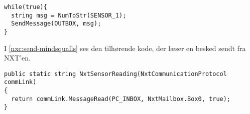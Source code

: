 \begin{lstlisting}[style=c,label=nxc:send,caption={Eksempel på afsending af besked.}]
while(true){
  string msg = NumToStr(SENSOR_1);
  SendMessage(OUTBOX, msg);
}
\end{lstlisting}

I \cref{nxc:send-mindsqualls} ses den tilhørende \mindsqualls kode, der læser en besked sendt fra NXT'en.

\begin{lstlisting}[style=c,breaklines=true,label=nxc:send-mindsqualls,caption={\mindsqualls kode der læser en besked sendt fra NXT'en.}]
public static string NxtSensorReading(NxtCommunicationProtocol commLink)
{
  return commLink.MessageRead(PC_INBOX, NxtMailbox.Box0, true);
}
\end{lstlisting}
